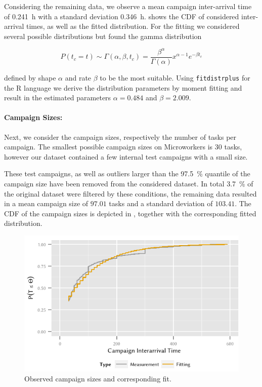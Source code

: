 Considering the remaining data, we observe a mean campaign inter-arrival time of \SI{0.241}{\hour} with a standard deviation \SI{0.346}{\hour}.
 shows the \gls{CDF} of considered inter-arrival times, as well as the fitted distribution.
For the fitting we considered several possible distributions but found the gamma distribution 

\[
P(t_c=t) \sim \Gamma(\alpha,\beta,t_c) = \frac{\beta^\alpha}{\Gamma(\alpha)} x^{\alpha-1} e^{-{\beta}t_c}
\]

defined by shape \(\alpha\) and rate \(\beta\) to be the most suitable.
Using \texttt{fitdistrplus} for the R language we derive the distribution parameters by moment fitting and result in the estimated parameters \(\alpha=0.484\) and \(\beta=2.009\).

\paragraph*{Campaign Sizes:}Next, we consider the campaign sizes, respectively the number of tasks per campaign.
The smallest possible campaign sizes on Microworkers is \(30\) tasks, however our dataset contained a few internal test campaigns with a small size.

These test campaigns, as well as outliers larger than the \SI{97.5}{\percent} quantile of the campaign size have been removed from the considered dataset.
In total \SI{3.7}{\percent} of the original dataset were filtered by these conditions, the remaining data resulted in a mean campaign size of \(97.01\) tasks and a standard deviation of \(103.41\).
The CDF of the campaign sizes is depicted in , together with the corresponding fitted distribution.

\begin{figure}
  \centering
  \includegraphics{cloud/crowdsourcing/measurements/figures/campaign_sizes}
  \caption{Observed campaign sizes \campaignSize and corresponding fit.}
  \label{fig:cloud:crowdsourcing:measurements:parameters:campaign_sizes}
\end{figure}

